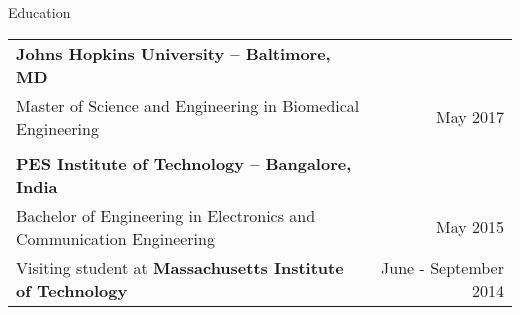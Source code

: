 \documentclass{resume}
\begin{document}
\thispagestyle{empty}
  \begin{rSection}{Education}
\begin{tabular*}{\textwidth}{@{\extracolsep{\fill}}lr@{}}
\textbf{\large Johns Hopkins University -- Baltimore, MD} &  \\
{Master of Science and Engineering in Biomedical Engineering} & May 2017 \\
\\
\textbf{\large PES Institute of Technology -- Bangalore, India} & \\
{Bachelor of Engineering in Electronics and Communication Engineering} & May 2015 \\
Visiting student at \textbf{Massachusetts Institute of Technology} & June - September 2014
\end{tabular*}
  \end{rSection}
\end{document}
